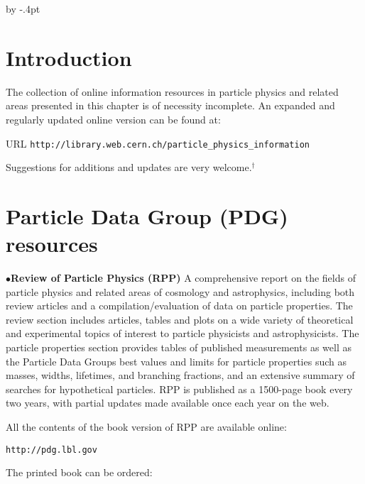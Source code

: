 %
\itemindent=10pt

\advance\baselineskip by -.4pt


\parindent=0pt
\medskip

\def\url#1{\tt#1\rm}
\section{Introduction}%

The collection of online information resources in particle physics and related areas presented in this chapter is of necessity incomplete. An expanded and regularly updated online version can be found at: 

	
		\item{}\qquad URL \url{http://library.web.cern.ch/particle\_physics\_information}

	


Suggestions for additions and updates are very welcome.$^\dagger$ 


\section{Particle Data Group (PDG) resources}%

\item{$\bullet$}{\bf Review of Particle Physics (RPP)}
A comprehensive report on the fields of particle physics and related areas of cosmology and astrophysics, including both review articles and a compilation/evaluation of data on particle properties. The review section includes articles, tables and plots on a wide variety of theoretical and experimental topics of interest to particle physicists and astrophysicists. The particle properties section provides tables of published measurements as well as the Particle Data Groups best values and limits for particle properties such as masses, widths, lifetimes, and branching fractions, and an extensive summary of searches for hypothetical particles. RPP is published as a 1500-page book every two years, with partial updates made available once each year on the web.

\item{} All the contents of the book version of RPP are available online:

         \item{}\qquad\url{http://pdg.lbl.gov}

\item{} The printed book can be ordered:

